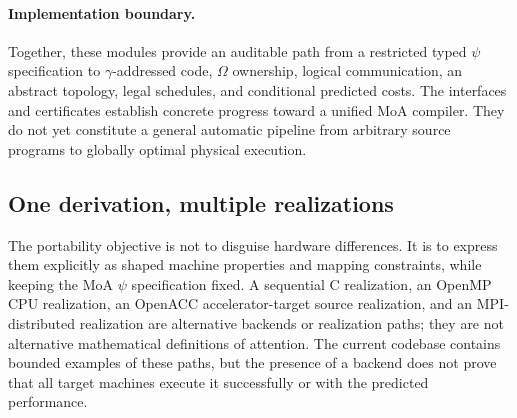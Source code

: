 \documentclass[11pt]{article}
\begin{document}
\paragraph{Implementation boundary.}
Together, these modules provide an auditable path from a restricted typed
$\psi$ specification to $\gamma$-addressed code, $\Omega$ ownership,
logical communication, an abstract topology, legal schedules, and conditional
predicted costs.  The interfaces and certificates establish concrete progress
toward a unified MoA compiler.  They do not yet constitute a general automatic
pipeline from arbitrary source programs to globally optimal physical execution.


\subsection{One derivation, multiple realizations}
\label{step108:subsec:moa-portability}

The portability objective is not to disguise hardware differences.
It is to express them explicitly as shaped machine properties and
mapping constraints, while keeping the MoA $\psi$ specification fixed.
A sequential C realization, an OpenMP CPU realization, an OpenACC
accelerator-target source realization, and an MPI-distributed
realization are alternative backends or realization paths; they are
not alternative mathematical definitions of attention.  The
current codebase contains bounded examples of these paths, but
the presence of a backend does not prove that all target machines
execute it successfully or with the predicted performance.
\end{document}
